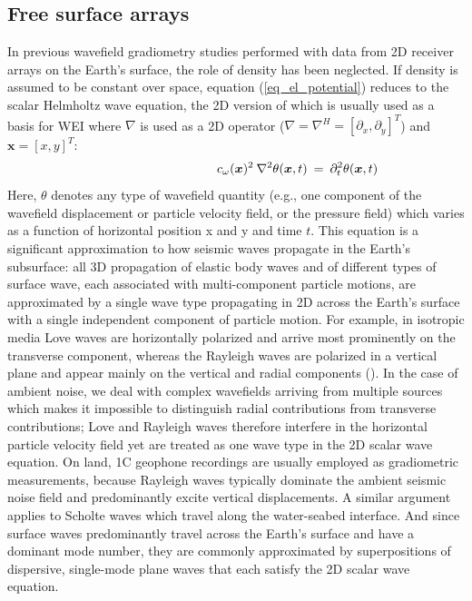 \documentclass{article} %
\providecommand{\DIFaddtex}[1]{{\protect\color{blue}\uwave{#1}}} %
\providecommand{\DIFdeltex}[1]{{\protect\color{red}\sout{#1}}}                      %
\providecommand{\DIFaddbegin}{} %
\providecommand{\DIFaddend}{} %
\providecommand{\DIFdelbegin}{} %
\providecommand{\DIFdelend}{} %
\providecommand{\DIFadd}[1]{\texorpdfstring{\DIFaddtex{#1}}{#1}} %
\providecommand{\DIFdel}[1]{\texorpdfstring{\DIFdeltex{#1}}{}} %
\newcommand{\DIFscaledelfig}{0.5}
\newlength{\DIFdelgraphicswidth} %
\newlength{\DIFdelgraphicsheight} %
\newcommand{\DIFaddincludegraphics}[2][]{{\color{blue}\fbox{\DIFOincludegraphics[#1]{#2}}}} %
\newcommand{\DIFdelincludegraphics}[2][]{%
\sbox{\DIFdelgraphicsbox}{\DIFOincludegraphics[#1]{#2}}%
\settoboxwidth{\DIFdelgraphicswidth}{\DIFdelgraphicsbox} %
\settoboxtotalheight{\DIFdelgraphicsheight}{\DIFdelgraphicsbox} %
\scalebox{\DIFscaledelfig}{%
\parbox[b]{\DIFdelgraphicswidth}{\usebox{\DIFdelgraphicsbox}\\[-\baselineskip] \rule{\DIFdelgraphicswidth}{0em}}\llap{\resizebox{\DIFdelgraphicswidth}{\DIFdelgraphicsheight}{%
\setlength{\unitlength}{\DIFdelgraphicswidth}%
\begin{picture}(1,1)%
\thicklines\linethickness{2pt} %
{\color[rgb]{1,0,0}\put(0,0){\framebox(1,1){}}}%
{\color[rgb]{1,0,0}\put(0,0){\line( 1,1){1}}}%
{\color[rgb]{1,0,0}\put(0,1){\line(1,-1){1}}}%
\end{picture}%
}\hspace*{3pt}}} %
} %
\DeclareRobustCommand{\DIFaddbegin}{\DIFOaddbegin \let\includegraphics\DIFaddincludegraphics} %
\DeclareRobustCommand{\DIFaddend}{\DIFOaddend \let\includegraphics\DIFOincludegraphics} %
\DeclareRobustCommand{\DIFdelbegin}{\DIFOdelbegin \let\includegraphics\DIFdelincludegraphics} %
\DeclareRobustCommand{\DIFdelend}{\DIFOaddend \let\includegraphics\DIFOincludegraphics} %
\begin{document}
	\DIFaddend \subsection{Free surface arrays}\label{methS}
	In previous wavefield gradiometry studies performed with data from 2D receiver arrays on the Earth's surface, the role of density has been neglected. If density is assumed to be constant over space, equation (\ref{eq_el_potential}) reduces to the scalar Helmholtz wave equation, the 2D version of which is usually used as a basis for WEI where $\nabla$ is used as a 2D operator (\DIFdelbegin \DIFdel{$\nabla = \nabla^{H} = [\partial_{x}, \partial_{y}]^{T}$}\DIFdelend \DIFaddbegin \DIFadd{$\nabla = \nabla_{H} = [\partial_{x}, \partial_{y}]^{T}$}\DIFaddend ) and $\bm{x} = [x,y]^{T}$:
	\begin{align}\label{eq:helm}
		\shoveright \shoveright \shoveright \shoveright \shoveright \shoveright \shoveright \shoveright \shoveright \shoveright%
		\: \; \; c_{\omega}(\bm{x})^{2} \: \nabla^{2} \theta(\bm{x},t) &\: = \: \partial_{t}^{2}\theta(\bm{x},t)
	\end{align}
	Here, $\theta$ denotes any type of wavefield quantity (e.g., one component of the wavefield displacement or particle velocity field, or the pressure field) which varies as a function of horizontal position x and y and time $t$. This equation is a significant approximation to how seismic waves propagate in the Earth's subsurface: all 3D propagation of elastic body waves and of different types of surface wave, each associated with multi-component particle motions, are approximated by a single wave type propagating in 2D across the Earth's surface with a single independent component of particle motion. For example, in isotropic media Love waves are horizontally polarized and arrive most prominently on the transverse component, whereas the Rayleigh waves are polarized in a vertical plane and appear mainly on the vertical and radial components (\cite{shearer2019introduction}). In the case of ambient noise, we deal with complex wavefields arriving from multiple sources which makes it impossible to distinguish radial contributions from transverse contributions; Love and Rayleigh waves therefore interfere in the horizontal particle velocity field yet are treated as one wave type in the 2D scalar wave equation. On land, 1C geophone recordings are usually employed as gradiometric measurements, because Rayleigh waves typically dominate the ambient seismic noise field and predominantly excite vertical displacements. A similar argument applies to Scholte waves which travel along the water-seabed interface. And since surface waves predominantly travel across the Earth's surface and have a dominant mode number, they are commonly approximated by superpositions of dispersive, single-mode plane waves that each satisfy the 2D scalar wave equation. \\%
\end{document}

